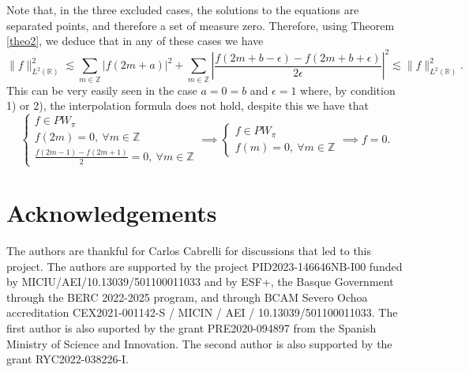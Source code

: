 \documentclass[reqno]{amsart}
\theoremstyle{plain}
\theoremstyle{definition}
\numberwithin{equation}{section}
\newcommand{\Z}{{\mathbb Z}}
\newcommand{\R}{{\mathbb R}}
\newcommand{\abs}[1]{\left\vert#1\right\vert}
\newcommand{\suc}[1]{\left\{#1\right\}}
\providecommand{\abs}[1]{ \lvert#1  \rvert}
\providecommand{\norm}[1]{ \lVert#1  \rVert}
\begin{document}
Note that, in the three excluded cases, the solutions to the equations are separated points, and therefore a set of measure zero. Therefore, using Theorem \ref{theo2}, we deduce that in any of these cases we have 
$$\norm{f}^2_{L^2(\R)}\lesssim \sum_{m\in\Z} \abs{f(2m+a)}^2 
+ \sum_{m\in\Z}\abs{\frac{f(2m+b-\epsilon)-f(2m+b+\epsilon)}{2\epsilon}}^2 
\lesssim \norm{f}^2_{L^2(\R)}.$$
This can be very easily seen in the case $a=0=b$ and $\epsilon=1$ where, by condition 1) or 2), the interpolation formula does not hold, despite this we have that
$$
\begin{cases}
    f\in PW_\pi \\
    f(2m)=0, \ \forall m\in\Z \\
    \frac{f(2m-1)-f(2m+1)}{2}=0, \ \forall m\in\Z
\end{cases} \implies
\begin{cases}
    f\in PW_\pi \\
    f(m)=0, \ \forall m\in\Z
\end{cases} \implies f=0.$$



\section*{Acknowledgements} The authors are thankful for Carlos Cabrelli for discussions that led to this project. The authors are supported by the project PID2023-146646NB-I00 funded by MICIU/AEI/10.13039/501100011033 and by ESF+, the Basque Government through the BERC 2022-2025 program, and through BCAM Severo Ochoa accreditation CEX2021-001142-S / MICIN / AEI / 10.13039/501100011033. The first author is also suported by the grant PRE2020-094897 from the Spanish Ministry of
Science and Innovation. The second author is also supported by the grant RYC2022-038226-I.
\end{document}
